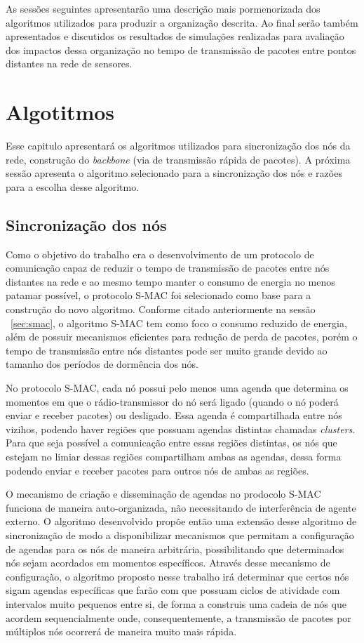 As sessões seguintes apresentarão uma descrição mais pormenorizada dos algoritmos utilizados para produzir a organização descrita. Ao final serão também apresentados e discutidos os resultados de simulações realizadas para avaliação dos impactos dessa organização no tempo de transmissão de pacotes entre pontos distantes na rede de sensores.

\section{Algotitmos}

Esse capitulo apresentará os algoritmos utilizados para sincronização dos nós da rede, construção do \emph{backbone} (via de transmissão rápida de pacotes). 
A próxima sessão apresenta o algoritmo selecionado para a sincronização dos nós e razões para a escolha desse algoritmo.

\subsection{Sincronização dos nós}

Como o objetivo do trabalho era o desenvolvimento de um protocolo de comunicação capaz de reduzir o tempo de transmissão de pacotes entre nós distantes na rede e ao mesmo tempo manter o consumo de energia no menos patamar possível, o protocolo S-MAC\cite{ye04} foi selecionado como base para a construção do novo algoritmo. Conforme citado anteriormente na sessão ~\ref{sec:smac}, o algoritmo S-MAC tem como foco o consumo reduzido de energia, além de possuir mecanismos eficientes para redução de perda de pacotes, porém o tempo de transmissão entre nós distantes pode ser muito grande devido ao tamanho dos períodos de dormência dos nós.

No protocolo S-MAC\cite{ye04}, cada nó possui pelo menos uma agenda que determina os momentos em que o rádio-transmissor do nó será ligado (quando o nó poderá enviar e receber pacotes) ou desligado. Essa agenda é compartilhada entre nós vizihos, podendo haver regiões que possuam agendas distintas chamadas \emph{clusters}. Para que seja possível a comunicação entre essas regiões distintas, os nós que estejam no limiar dessas regiões compartilham ambas as agendas, dessa forma podendo enviar e receber pacotes para outros nós de ambas as regiões.

O mecanismo de criação e disseminação de agendas no prodocolo S-MAC funciona de maneira auto-organizada, não necessitando de interferência de agente externo. O algoritmo desenvolvido propõe então uma extensão desse algoritmo de sincronização de modo a disponibilizar mecanismos que permitam a configuração de agendas para os nós de maneira arbitrária, possibilitando que determinados nós sejam acordados em momentos específicos. Através desse mecanismo de configuração, o algoritmo proposto nesse trabalho irá determinar que certos nós sigam agendas específicas que farão com que possuam ciclos de atividade com intervalos muito pequenos entre si, de forma a construis uma cadeia de nós que acordem sequencialmente onde, consequentemente, a transmissão de pacotes por múltiplos nós ocorrerá de maneira muito mais rápida.

